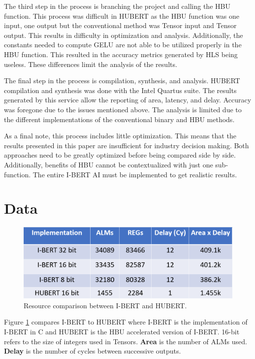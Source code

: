 \documentclass[12pt]{article}
\begin{document}
	The third step in the process is branching the project and calling the HBU function. This process was difficult in HUBERT as the HBU function was one input, one output but the conventional method was Tensor input and Tensor output. This results in difficulty in optimization and analysis. Additionally, the constants needed to compute GELU are not able to be utilized properly in the HBU function. This resulted in the accuracy metrics generated by HLS being useless. These differences limit the analysis of the results.
	
	The final step in the process is compilation, synthesis, and analysis. HUBERT compilation and synthesis was done with the Intel Quartus suite. The results generated by this service allow the reporting of area, latency, and delay. Accuracy was foregone due to the issues mentioned above. The analysis is limited due to the different implementations of the conventional binary and HBU methods.
	
	As a final note, this process includes little optimization. This means that the results presented in this paper are insufficient for industry decision making. Both approaches need to be greatly optimized  before being compared side by side. Additionally, benefits of HBU cannot be contextualized with just one sub-function. The entire I-BERT AI must be implemented to get realistic results. 
	\newpage
	\section*{Data}
	
	\begin{figure}[h!]
		\centering
		\includegraphics[width=\linewidth]{figures/data.png}
		\caption{Resource comparison between I-BERT and HUBERT.}
		\label{fig:data}
	\end{figure}

	Figure \ref{fig:data} compares I-BERT to HUBERT where I-BERT is the implementation of I-BERT in C and HUBERT is the HBU accelerated version of I-BERT. 16-bit refers to the size of integers used in Tensors.
	\textbf{Area} is the number of ALMs used.
	\textbf{Delay} is the number of cycles between successive outputs.
	
\end{document}
